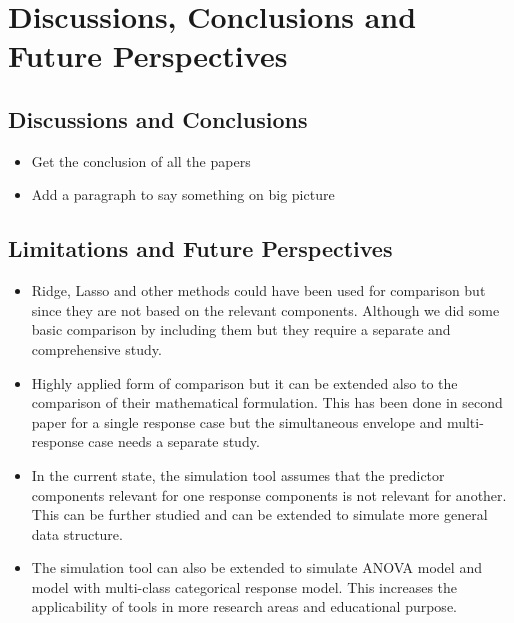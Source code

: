 \documentclass[11pt,twoside,openright,titlepage,
  headinclude,footinclude,BCOR=5mm,
  numbers=noenddot,cleardoublepage=empty,
  tablecaptionabove, dottedtoc,
  bibliography=totoc]{scrreprt}
\providecommand{\tightlist}{%
  \setlength{\itemsep}{0pt}\setlength{\parskip}{0pt}}
\begin{document}
\hypertarget{discussions-conclusions-and-future-perspectives}{%
\chapter{Discussions, Conclusions and Future Perspectives}\label{discussions-conclusions-and-future-perspectives}}

\hypertarget{discussions-and-conclusions}{%
\section{Discussions and Conclusions}\label{discussions-and-conclusions}}

\begin{itemize}
\tightlist
\item
  Get the conclusion of all the papers
\item
  Add a paragraph to say something on big picture
\end{itemize}

\hypertarget{limitations-and-future-perspectives}{%
\section{Limitations and Future Perspectives}\label{limitations-and-future-perspectives}}

\begin{itemize}
\tightlist
\item
  Ridge, Lasso and other methods could have been used for comparison but since they are not based on the relevant components. Although we did some basic comparison by including them but they require a separate and comprehensive study.
\item
  Highly applied form of comparison but it can be extended also to the comparison of their mathematical formulation. This has been done in second paper for a single response case but the simultaneous envelope and multi-response case needs a separate study.
\item
  In the current state, the simulation tool assumes that the predictor components relevant for one response components is not relevant for another. This can be further studied and can be extended to simulate more general data structure.
\item
  The simulation tool can also be extended to simulate ANOVA model and model with multi-class categorical response model. This increases the applicability of tools in more research areas and educational purpose.
\end{itemize}
\end{document}
